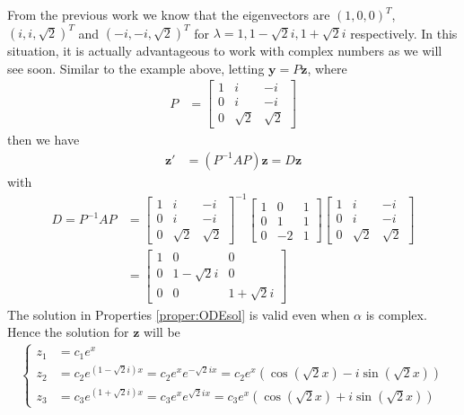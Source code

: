 \begin{solution}
From the previous work we know that the eigenvectors are $(1,0,0)^T$, $(i, i,\sqrt{2})^T$ and $(-i,-i,\sqrt{2})^T$ for $\lambda = 1, 1-\sqrt{2}i, 1+\sqrt{2}i$ respectively. In this situation, it is actually advantageous to work with complex numbers as we will see soon. Similar to the example above, letting $\textbf{y} = P\textbf{z}$, where
\begin{align*}
P &=
\begin{bmatrix}
1 & i & -i \\
0 & i & -i \\
0 & \sqrt{2} & \sqrt{2} 
\end{bmatrix}
\end{align*}
then we have
\begin{align*}
\textbf{z}' &= (P^{-1}AP)\textbf{z} = D\textbf{z}
\end{align*}
with 
\begin{align*}
D = P^{-1}AP &= 
\begin{bmatrix}
1 & i & -i \\
0 & i & -i \\
0 & \sqrt{2} & \sqrt{2} 
\end{bmatrix}^{-1}
\begin{bmatrix}
1 & 0 & 1 \\
0 & 1 & 1 \\
0 & -2 & 1
\end{bmatrix}
\begin{bmatrix}
1 & i & -i \\
0 & i & -i \\
0 & \sqrt{2} & \sqrt{2} 
\end{bmatrix}
\\&=
\begin{bmatrix}
1 & 0 & 0 \\
0 & 1 - \sqrt{2}i & 0 \\
0 & 0 & 1 + \sqrt{2}i
\end{bmatrix}
\end{align*}
The solution in Properties \ref{proper:ODEsol} is valid even when $\alpha$ is complex. Hence the solution for $\textbf{z}$ will be
\begin{align*}
\begin{cases}
z_1 &= c_1e^x \\
z_2 &= c_2e^{(1-\sqrt{2}i)x} = c_2e^{x}e^{-\sqrt{2}i x} = c_2e^{x}(\cos(\sqrt{2}x) - i\sin(\sqrt{2}x))\\
z_3 &= c_3e^{(1+\sqrt{2}i)x} = c_3e^{x}e^{\sqrt{2}i x} = c_3e^{x}(\cos(\sqrt{2}x) + i\sin(\sqrt{2}x))

\end{cases}
\end{align*}
\end{solution}
